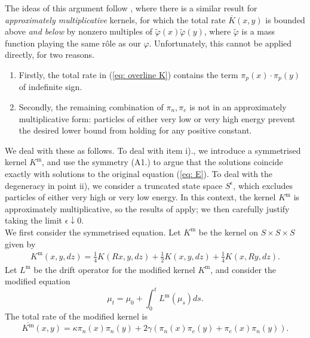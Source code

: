 The ideas of this argument follow \cite{N00}, where there is a similar result for \emph{approximately multiplicative} kernels, for which the total rate $\overline{K}(x,y)$ is bounded above \emph{and below} by nonzero multiples of $\widetilde{\varphi}(x)\widetilde{\varphi}(y)$, where $\widetilde{\varphi}$ is a mass function playing the same r\^ole as our $\varphi$. Unfortunately, this cannot be applied directly, for two reasons. \begin{enumerate}[label=\roman{*}).]
    \item Firstly, the total rate in (\ref{eq: overline K}) contains the term $\pi_p(x)\cdot\pi_p(y)$ of indefinite sign.
    \item Secondly, the remaining combination of $\pi_n, \pi_e$ is not in an approximately multiplicative form: particles of either very low or very high energy prevent the desired lower bound from holding for any positive constant.
\end{enumerate}
We deal with these as follows. To deal with item i)., we introduce a symmetrised kernel $K^\mathrm{m}$, and use the symmetry (A1.) to argue that the solutions coincide exactly with solutions to the original equation (\ref{eq: E}). To deal with the degeneracy in point ii), we consider a truncated state space $S^\epsilon$, which excludes particles of either very high or very low energy. In this context, the kernel $K^\mathrm{m}$ is approximately multiplicative, so the results of \cite{N00} apply; we then carefully justify taking the limit $\epsilon \downarrow 0$. \medskip \\ 
We first consider the symmetrised equation. Let $K^\mathrm{m}$ be the kernel on $S\times S\times S$ given by
 \begin{equation}\label{eq: modified K} 
 \begin{split}
 K^\mathrm{m}(x,y,dz)
 =\frac{1}{4}K(Rx, y, dz)+\frac{1}{2}K(x,y,dz)+\frac{1}{4}K(x,Ry, dz). \end{split} 
\end{equation}
Let $L^\mathrm{m}$ be the drift operator for the modified kernel $K^\mathrm{m}$, and consider the modified equation \begin{equation} \tag{mE-G}\label{eq: mE}
    \mu_t=\mu_0+\int_0^t L^\mathrm{m}(\mu_s)ds.
\end{equation}The total rate of the modified kernel is \begin{equation}
    \label{eq: modified Kbar} 
    \overline{K^\mathrm{m}}(x,y)=\kappa \pi_n(x) \pi_n(y) + 2\gamma(\pi_n(x)\pi_e(y)+\pi_e(x)\pi_n(y)).
\end{equation}
